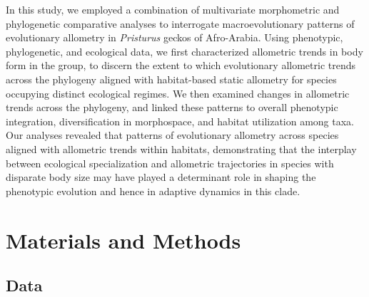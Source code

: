 \documentclass[
  11pt,
]{article}
\begin{document}
In this study, we employed a combination of multivariate morphometric
and phylogenetic comparative analyses to interrogate macroevolutionary
patterns of evolutionary allometry in \emph{Pristurus} geckos of
Afro-Arabia. Using phenotypic, phylogenetic, and ecological data, we
first characterized allometric trends in body form in the group, to
discern the extent to which evolutionary allometric trends across the
phylogeny aligned with habitat-based static allometry for species
occupying distinct ecological regimes. We then examined changes in
allometric trends across the phylogeny, and linked these patterns to
overall phenotypic integration, diversification in morphospace, and
habitat utilization among taxa. Our analyses revealed that patterns of
evolutionary allometry across species aligned with allometric trends
within habitats, demonstrating that the interplay between ecological
specialization and allometric trajectories in species with disparate
body size may have played a determinant role in shaping the phenotypic
evolution and hence in adaptive dynamics in this clade.

\hypertarget{materials-and-methods}{%
\section{Materials and Methods}\label{materials-and-methods}}

\hypertarget{data}{%
\subsection{Data}\label{data}}
\end{document}
